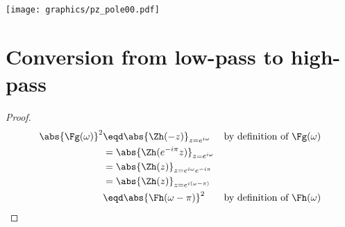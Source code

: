 \texttt{[image: graphics/pz\_pole00.pdf]}

\section{Conversion from low-pass to high-pass}
\begin{theorem}
\end{theorem}
\begin{proof}
  \begin{align*}
    \abs{\Fg(\omega)}^2
      &\eqd \abs{\Zh(-z)}_{z=e^{i\omega}}
      && \text{by definition of $\Fg(\omega)$}
    \\&= \abs{\Zh(e^{-i\pi}z)}_{z=e^{i\omega}}
    \\&= \abs{\Zh(z)}_{z=e^{i\omega}e^{-i\pi}}
    \\&= \abs{\Zh(z)}_{z=e^{i(\omega-\pi)}}
    \\&\eqd \abs{\Fh(\omega-\pi)}^2
      && \text{by definition of $\Fh(\omega)$}
  \end{align*}
\end{proof}

